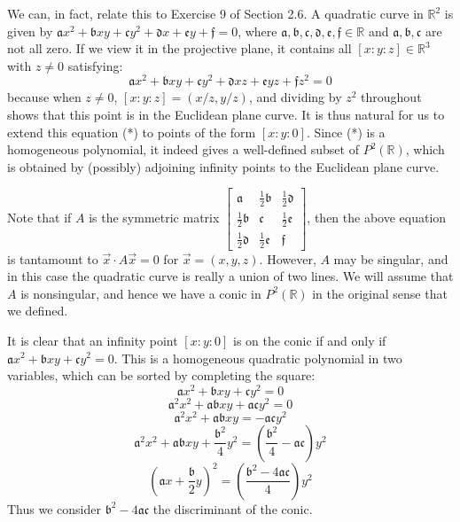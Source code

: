 \documentclass[leqno]{book}
\begin{document}
We can, in fact, relate this to Exercise 9 of Section 2.6.  A quadratic curve in $\mathbb R^2$ is given by $\mathfrak ax^2+\mathfrak bxy+\mathfrak cy^2+\mathfrak dx+\mathfrak ey+\mathfrak f=0$, where $\mathfrak a,\mathfrak b,\mathfrak c,\mathfrak d,\mathfrak e,\mathfrak f\in\mathbb R$ and $\mathfrak a,\mathfrak b,\mathfrak c$ are not all zero.  If we view it in the projective plane, it contains all $[x:y:z]\in\mathbb R^3$ with $z\ne 0$ satisfying:
\begin{equation}\tag{*}\mathfrak ax^2+\mathfrak bxy+\mathfrak cy^2+\mathfrak dxz+\mathfrak eyz+\mathfrak fz^2=0\end{equation}
because when $z\ne 0$, $[x:y:z]=(x/z,y/z)$, and dividing by $z^2$ throughout shows that this point is in the Euclidean plane curve.  It is thus natural for us to extend this equation (*) to points of the form $[x:y:0]$.  Since (*) is a homogeneous polynomial, it indeed gives a well-defined subset of $P^2(\mathbb R)$, which is obtained by (possibly) adjoining infinity points to the Euclidean plane curve.

Note that if $A$ is the symmetric matrix $\begin{bmatrix}\mathfrak a&\frac 12\mathfrak b&\frac 12\mathfrak d\\\frac 12\mathfrak b&\mathfrak c&\frac 12\mathfrak e\\\frac 12\mathfrak d&\frac 12\mathfrak e&\mathfrak f\end{bmatrix}$, then the above equation is tantamount to $\vec x\cdot A\vec x=0$ for $\vec x=(x,y,z)$.  However, $A$ may be singular, and in this case the quadratic curve is really a union of two lines.  We will assume that $A$ is nonsingular, and hence we have a conic in $P^2(\mathbb R)$ in the original sense that we defined.

It is clear that an infinity point $[x:y:0]$ is on the conic if and only if $\mathfrak ax^2+\mathfrak bxy+\mathfrak cy^2=0$.  This is a homogeneous quadratic polynomial in two variables, which can be sorted by completing the square:
$$\mathfrak ax^2+\mathfrak bxy+\mathfrak cy^2=0$$
$$\mathfrak a^2x^2+\mathfrak a\mathfrak bxy+\mathfrak a\mathfrak cy^2=0$$
$$\mathfrak a^2x^2+\mathfrak a\mathfrak bxy=-\mathfrak a\mathfrak cy^2$$
$$\mathfrak a^2x^2+\mathfrak a\mathfrak bxy+\frac{\mathfrak b^2}4y^2=\left(\frac{\mathfrak b^2}4-\mathfrak a\mathfrak c\right)y^2$$
$$\left(\mathfrak ax+\frac{\mathfrak b}2y\right)^2=\left(\frac{\mathfrak b^2-4\mathfrak a\mathfrak c}4\right)y^2$$
Thus we consider $\mathfrak b^2-4\mathfrak a\mathfrak c$ the discriminant of the conic.
\end{document}
